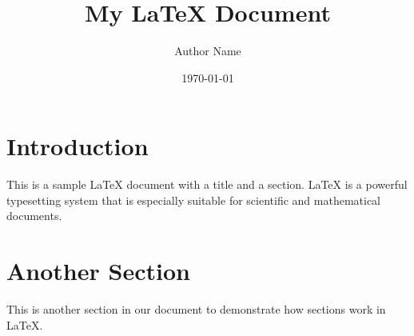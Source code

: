 \documentclass{article}
\title{My LaTeX Document}
\author{Author Name}
\date{\today}
\begin{document}
\maketitle
\section{Introduction}
This is a sample LaTeX document with a title and a section. LaTeX is a powerful typesetting system that is especially suitable for scientific and mathematical documents.

\section{Another Section}
This is another section in our document to demonstrate how sections work in LaTeX.
\end{document}
